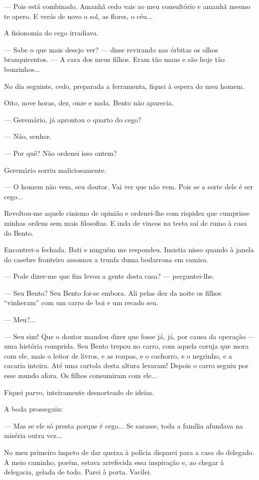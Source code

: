 --- Pois está combinado. Amanhã cedo vais ao meu consultório e amanhã
mesmo te opero. E verás de novo o sol, as flores, o céu...

A fisionomia do cego irradiava.

--- Sabe o que mais desejo ver? --- disse revirando nas órbitas os olhos
branquicentos. --- A cara dos meus filhos. Eram tão maus e são hoje tão
bonzinhos...

No dia seguinte, cedo, preparada a ferramenta, fiquei à espera do meu
homem.

Oito, nove horas, dez, onze e nada. Bento não aparecia.

--- Geremário, já aprontou o quarto do cego?

--- Não, senhor.

--- Por quê? Não ordenei isso ontem?

Geremário sorriu maliciosamente.

--- O homem não vem, seu doutor. Vai ver que não vem. Pois se a sorte
dele é ser cego...

Revoltou-me aquele cinismo de opinião e ordenei-lhe com rispidez que
cumprisse minhas ordens sem mais filosofias. E inda de vincos na testa
saí de rumo à casa do Bento.

Encontrei-a fechada. Bati e ninguém me respondeu. Insistia nisso quando
à janela do casebre fronteiro assomou a trunfa duma bodarrona em camisa.

--- Pode dizer-me que fim levou a gente desta casa? --- perguntei-lhe.

--- Seu Bento? Seu Bento foi-se embora. Ali pelas dez da noite os filhos
``vinheram'' com um carro de boi e um recado seu.

--- Meu?...

--- Seu sim! Que o doutor mandou dizer que fosse já, já, por causa da
operação --- uma história comprida. Seu Bento trepou no carro, com
aquela coruja que mora com ele, mais o leitor de livros, e as roupas, e
o cachorro, e o negrinho, e a cacaria inteira. Até uma cartola desta
altura levaram! Depois o carro seguiu por esse mundo afora. Os filhos
consumiram com ele...

Fiquei parvo, inteiramente desnorteado de ideias.

A boda prosseguiu:

--- Mas se ele só presta porque é cego... Se sarasse, toda a família
afundava na miséria outra vez...

No meu primeiro ímpeto de dar queixa à polícia disparei para a casa do
delegado. A meio caminho, porém, estava arrefecida essa inspiração e, ao
chegar à delegacia, gelada de todo. Parei à porta. Vacilei.


